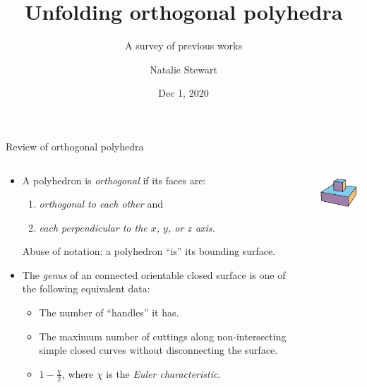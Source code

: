 \documentclass[handout]{beamer}
\theoremstyle{plain}
\begin{document}
  \title{Unfolding orthogonal polyhedra}
  \subtitle{A survey of previous works}
  \author{Natalie Stewart}
  \date{Dec 1, 2020}
  \frame{\titlepage}



  \begin{frame}{Review of orthogonal polyhedra}
    \begin{columns}
      \begin{column}{0.8\textwidth}
        \begin{itemize}
          \item A polyhedron is \emph{orthogonal} if its faces are:
            \begin{enumerate}
              \pause \item \emph{orthogonal to each other} and 
              \pause \item \emph{each perpendicular to the $x$, $y$, or $z$ axis.}
            \end{enumerate}
            \pause Abuse of notation: a polyhedron ``is'' its bounding surface.
          \pause \item The \emph{genus} of an connected orientable closed surface is one of the following equivalent data:
            \begin{itemize}
              \item The number of ``handles'' it has.
              \item The maximum number of cuttings along non-intersecting simple closed curves without disconnecting the surface.
              \item $1 - \frac{\chi}{2}$, where $\chi$ is the \emph{Euler characteristic}.
            \end{itemize}
        \end{itemize}  
      \end{column}
      \begin{column}{.2\textwidth}
        \begin{center}
          \includegraphics[width=.8\textwidth]{./figs/genus_0_orthogonal_polyhedron.png}\\

\end{center}
\end{column}
\end{columns}
\end{frame}
\end{document}
